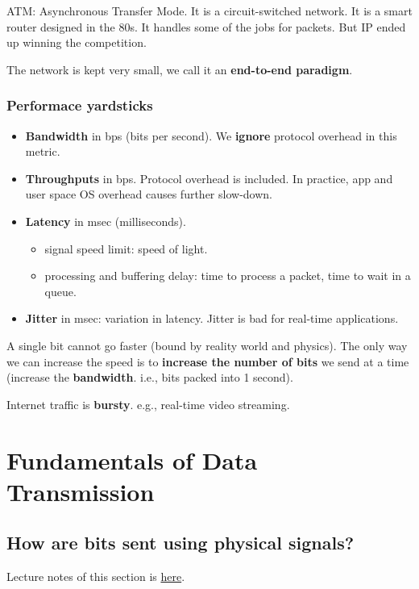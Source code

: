 \documentclass{../../ainote}
\begin{document}
\begin{supp}
    ATM: Asynchronous Transfer Mode. It is a circuit-switched network. It is a smart router designed in the 80s. It handles some of the jobs for packets. But IP ended up winning the competition. 
\end{supp}

The network is kept very small, we call it an \textbf{end-to-end paradigm}.


\subsubsection{Performace yardsticks}
\begin{itemize}[leftmargin=*]
    \item \textbf{Bandwidth} in bps (bits per second). We \textbf{ignore} protocol overhead in this metric.
    \item \textbf{Throughputs} in bps. Protocol overhead is included. In practice, app and user space OS overhead causes further slow-down.
    \item \textbf{Latency} in msec (milliseconds).
        \begin{itemize}
            \item signal speed limit: speed of light.
            \item processing and buffering delay: time to process a packet, time to wait in a queue.
        \end{itemize}
    \item \textbf{Jitter} in msec: variation in latency.  Jitter is bad for real-time applications.
\end{itemize}

A single bit cannot go faster (bound by reality world and physics). The only way we can increase the speed is to \textbf{increase the number of bits} we send at a time (increase the \textbf{bandwidth}. i.e., bits packed into 1 second). 

Internet traffic is \textbf{bursty}. e.g., real-time video streaming.

\newpage

\section{Fundamentals of Data Transmission}

\subsection{How are bits sent using physical signals?}
Lecture notes of this section is \href{https://www.cs.purdue.edu/homes/park/cs536/data_trans-536-24s-a.pdf}{here}.
\end{document}
